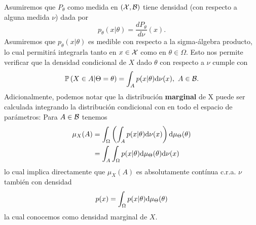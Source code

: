 Asumiremos que $P_\theta$ como medida en $({\mathcal X},{\mathcal B})$ tiene densidad (con respecto a alguna medida $\nu$) dada por
\begin{equation}
 	p_\theta(x|\theta) = \frac{dP_\theta}{d\nu}(x).
 \end{equation}
 Asumiremos que $p_\theta(x|\theta)$ es medible con respecto a la sigma-álgebra producto, lo cual permitirá integrarla tanto en $x\in{\mathcal X}$ como en $\theta\in\Omega$. Esto nos permite verificar que la densidad condicional de $X$ dado $\theta$ con respecto a $\nu$ cumple con 
 \begin{equation}
  	\mathbb{P} \left(X\in A |\Theta=\theta \right) = \int_A p(x|\theta){\text{d}}\nu(x),\ A\in{\mathcal B}.
  \end{equation} 
  Adicionalmente, podemos notar que la distribución \textbf{marginal} de X puede ser calculada integrando la distribución condicional con en todo el espacio de parámetros: Para $A\in{\mathcal B}$ tenemos
  \begin{align}
  	\mu_X(A) &= \int_\Omega \left(\int_A p(x|\theta){\text{d}}\nu(x)\right){\text{d}}\mu_\Theta(\theta)\\
  			&= \int_A \int_\Omega  p(x|\theta) {\text{d}}\mu_\Theta(\theta) {\text{d}}\nu(x)\nonumber
  \end{align}
  lo cual implica directamente que $\mu_X(A)$ es absolutamente contínua c.r.a. $\nu$ también con densidad 
  \begin{equation}
  	p(x) = \int_\Omega  p(x|\theta) {\text{d}}\mu_\Theta(\theta)
  \end{equation}
  la cual conocemos como densidad marginal de $X$.

